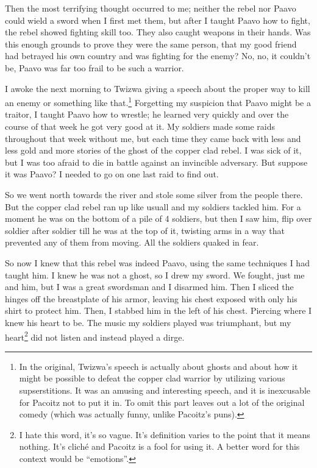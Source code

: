 Then the most terrifying thought occurred to me; neither the rebel nor Paavo could wield a sword when I first met them, but after I taught Paavo how to fight, the rebel showed fighting skill too. They also caught weapons in their hands. Was this enough grounds to prove they were the same person, that my good friend had betrayed his own country and was fighting for the enemy? No, no, it couldn't be, Paavo was far too frail to be such a warrior.

\tbreak

I awoke the next morning to Twizwa giving a speech about the proper way to kill an enemy or something like that.\footnote{In the original, Twizwa's speech is actually about ghosts and about how it might be possible to defeat the copper clad warrior by utilizing various supserstitions. It was an amusing and interesting speech, and it is inexcusable for Pacoitz not to put it in. To omit this part leaves out a lot of the original comedy (which was actually funny, unlike Pacoitz's puns).}
Forgetting my suspicion that Paavo might be a traitor, I taught Paavo how to wrestle; he learned very quickly and over the course of that week he got very good at it. My soldiers made some raids throughout that week without me, but each time they came back with less and less gold and more stories of the ghost of the copper clad rebel. I was sick of it, but I was too afraid to die in battle against an invincible adversary. But suppose it was Paavo? I needed to go on one last raid to find out.

So we went north towards the river and stole some silver from the people there. But the copper clad rebel ran up like usuall and my soldiers tackled him. For a moment he was on the bottom of a pile of 4 soldiers, but then I saw him, flip over soldier after soldier till he was at the top of it, twisting arms in a way that prevented any of them from moving. All the soldiers quaked in fear.

So now I knew that this rebel was indeed Paavo, using the same techniques I had taught him. I knew he was not a ghost, so I drew my sword. We fought, just me and him, but I was a great swordsman and I disarmed him. Then I sliced the hinges off the breastplate of his armor, leaving his chest exposed with only his shirt to protect him. Then, I stabbed him in the left of his chest. Piercing where I knew his heart to be. The music my soldiers played was triumphant, but my heart\footnote{I hate this word, it's so vague. It's definition varies to the point that it means nothing. It's clich\'{e} and Pacoitz is a fool for using it. A better word for this context would be ``emotions''.} did not listen and instead played a dirge. 

